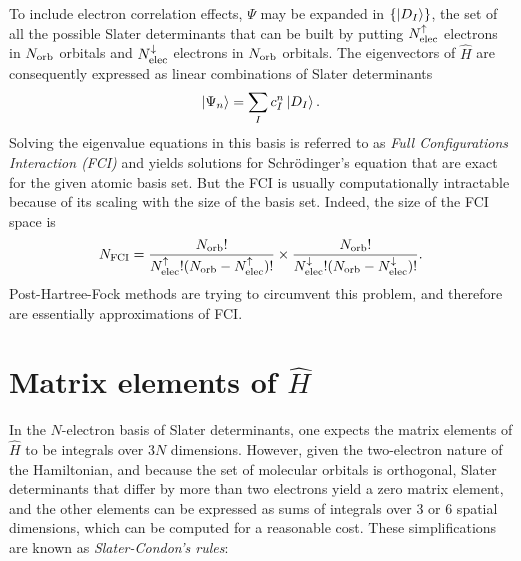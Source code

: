 \documentclass[./thesis.tex]{subfiles}
\begin{document}
To include electron correlation effects, $\Psi$ may be expanded in
$\{\ket{D_I} \}$, the set of all the possible Slater determinants that can be built by putting ${N_\text{elec}^{\uparrow}}$ electrons in ${N_\text{orb}}$ orbitals and ${N_\text{elec}^{\downarrow}}$ electrons in ${N_\text{orb}}$ orbitals.
The eigenvectors of $\widehat{H}$ are consequently expressed as linear combinations of Slater determinants 
\begin{equation}
\ket{\Psi_n} = \sum_{I} c_I^n \ket{D_I}.
\end{equation}
Solving the eigenvalue equations in this basis is referred to as \emph{Full Configurations Interaction (FCI)} and yields solutions for Schrödinger's equation that are exact for the given atomic basis set.
But the FCI is usually computationally intractable because of its scaling with the size of the basis set. Indeed, the size of the FCI space is
\begin{equation}
N_\text{FCI} = \frac{{N_\text{orb}}!}{{N_\text{elec}^{\uparrow}} ! ({N_\text{orb}}-{N_\text{elec}^{\uparrow}})!} \times \frac{{N_\text{orb}}!}{{N_\text{elec}^{\downarrow}} ! ({N_\text{orb}}-{N_\text{elec}^{\downarrow}})!}.
\end{equation}
Post-Hartree-Fock methods are trying to circumvent this problem, and therefore
are essentially approximations of FCI.

\section{Matrix elements of ${\widehat H}$}
\label{sec:meth_mel}

In the $N$-electron basis of Slater determinants, one expects the matrix elements of $\widehat H$ to be integrals over $3N$ dimensions.
However, given the two-electron nature of the Hamiltonian, and because the set of molecular orbitals is orthogonal, Slater determinants that differ by more than two electrons yield a zero matrix element, and the other elements can be expressed as sums of integrals over 3 or 6 spatial dimensions, which can be computed for a reasonable cost. These simplifications are known as \emph{Slater-Condon's rules}:
\end{document}
